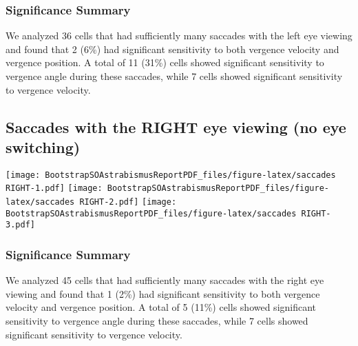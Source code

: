 \documentclass[]{article}
\begin{document}
\subsubsection{Significance Summary}\label{significance-summary-2}

We analyzed 36 cells that had sufficiently many saccades with the left
eye viewing and found that 2 (6\%) had significant sensitivity to both
vergence velocity and vergence position. A total of 11 (31\%) cells
showed significant sensitivity to vergence angle during these saccades,
while 7 cells showed significant sensitivity to vergence velocity.

\subsection{Saccades with the RIGHT eye viewing (no eye
switching)}\label{saccades-with-the-right-eye-viewing-no-eye-switching}

\texttt{[image: BootstrapSOAstrabismusReportPDF\_files/figure-latex/saccades RIGHT-1.pdf]}
\texttt{[image: BootstrapSOAstrabismusReportPDF\_files/figure-latex/saccades RIGHT-2.pdf]}
\texttt{[image: BootstrapSOAstrabismusReportPDF\_files/figure-latex/saccades RIGHT-3.pdf]}

\subsubsection{Significance Summary}\label{significance-summary-3}

We analyzed 45 cells that had sufficiently many saccades with the right
eye viewing and found that 1 (2\%) had significant sensitivity to both
vergence velocity and vergence position. A total of 5 (11\%) cells
showed significant sensitivity to vergence angle during these saccades,
while 7 cells showed significant sensitivity to vergence velocity.
\end{document}
